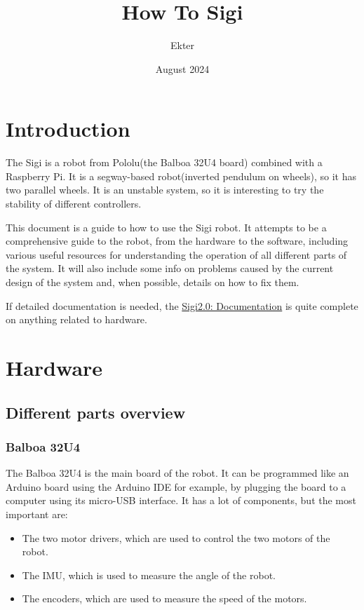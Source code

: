 \documentclass{article}
\begin{document}
\title{How To Sigi}
\author{Ekter}
\date{August 2024}
\maketitle


\section{Introduction}

The Sigi is a robot from Pololu(the Balboa 32U4 board) combined with a Raspberry Pi.
It is a segway-based robot(inverted pendulum on wheels), so it has two parallel wheels.
It is an unstable system, so it is interesting to try the stability of different controllers.

This document is a guide to how to use the Sigi robot.
It attempts to be a comprehensive guide to the robot, from the hardware to the software,
including various useful resources for understanding the operation of all different parts of the system.
It will also include some info on problems caused by the current design of the system and,
when possible, details on how to fix them.

If detailed documentation is needed, the \href{file://other_doc/Sigi_documentation_part1.pdf}{Sigi2.0: Documentation}
is quite complete on anything related to hardware.


\section{Hardware}

\subsection{Different parts overview}
\subsubsection{Balboa 32U4}
The Balboa 32U4 is the main board of the robot.
It can be programmed like an Arduino board using the Arduino IDE for example, by plugging the board to a
computer using its micro-USB interface.
It has a lot of components, but the most important are:
\begin{itemize}
    \item The two motor drivers, which are used to control the two motors of the robot.

    \item The IMU, which is used to measure the angle of the robot.

    \item The encoders, which are used to measure the speed of the motors.
\end{itemize}
\end{document}
